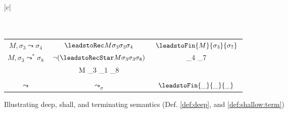 
\begin{figure}[htb]
\begin{tabular}{|c|}
\hline \\
\\
\hline
\\
\begin{tabular}{c|c|c}
$M, {\sigma_3} \leadsto  \sigma_4 $ & 
  $\leadstoRec  M  {\sigma_3} {\sigma_3}  {\sigma_4} $ & 
  $\leadstoFin {M} {\sigma_3} {\sigma_7}$
\\
 $M, {\sigma_3} \leadsto^*  \sigma_8 $ & 
$\neg(\leadstoRecStar M {\sigma_3} {\sigma_3}   {\sigma_8})$ 
&
\leadstoFin {M} {\sigma_4} {\sigma_7} \\
&
 \leadstoRecStar M {\sigma_3} {\sigma_1}   {\sigma_8}
  &
   \\
 \hline
 \\
 $\leadsto$
 &
 $\leadsto_{\sigma}$
 &
  $\leadstoFin {\_} {\_} {\_}$
\\
\hline
\end{tabular}
\end{tabular}
   \caption{Illustrating  %
   deep, shall, and terminating semantics
     (Def. \ref{def:deep}, and \ref{def:shallow:term})%
    }
   \label{fig:UpSemantics}
 \end{figure}

